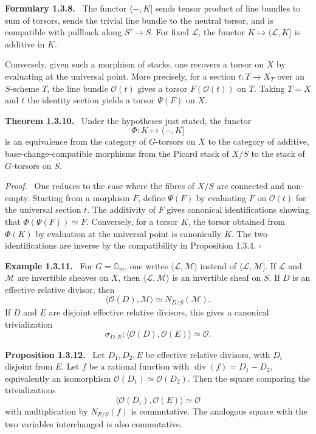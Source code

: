 \documentclass[12pt]{article}
\newcommand{\Ll}{\mathcal L}
\newcommand{\Mm}{\mathcal M}
\newcommand{\Ocal}{\mathcal O}
\newcommand{\qedtext}{\hfill\(\square\)}
\newenvironment{statement}[1]{\par\medskip\noindent\textbf{#1.}\ }{\par\medskip}
\newenvironment{remarktext}[1]{\par\medskip\noindent\textbf{#1.}\ }{\par\medskip}
\newenvironment{prooftext}[1][Proof]{\par\noindent\emph{#1.}\ }{\par\medskip}
\begin{document}
\begin{statement}{Formulary 1.3.8}
The functor \(\langle -,K]\) sends tensor product of line bundles to sum of torsors, sends the trivial line bundle to the neutral torsor, and is compatible with pullback along \(S'\to S\). For fixed \(\Ll\), the functor \(K\mapsto\langle\Ll,K]\) is additive in \(K\).
\end{statement}

Conversely, given such a morphism of stacks, one recovers a torsor on \(X\) by evaluating at the universal point. More precisely, for a section \(t:T\to X_T\) over an \(S\)-scheme \(T\), the line bundle \(\Ocal(t)\) gives a torsor \(F(\Ocal(t))\) on \(T\). Taking \(T=X\) and \(t\) the identity section yields a torsor \(\Psi(F)\) on \(X\).

\begin{statement}{Theorem 1.3.10}
Under the hypotheses just stated, the functor
\[
\Phi:K\longmapsto\langle -,K]
\]
is an equivalence from the category of \(G\)-torsors on \(X\) to the category of additive, base-change-compatible morphisms from the Picard stack of \(X/S\) to the stack of \(G\)-torsors on \(S\).
\end{statement}

\begin{prooftext}
One reduces to the case where the fibres of \(X/S\) are connected and non-empty. Starting from a morphism \(F\), define \(\Psi(F)\) by evaluating \(F\) on \(\Ocal(t)\) for the universal section \(t\). The additivity of \(F\) gives canonical identifications showing that \(\Phi(\Psi(F))\simeq F\). Conversely, for a torsor \(K\), the torsor obtained from \(\Phi(K)\) by evaluation at the universal point is canonically \(K\). The two identifications are inverse by the compatibility in Proposition 1.3.4. \qedtext
\end{prooftext}

\begin{remarktext}{Example 1.3.11}
For \(G=\mathbb G_m\), one writes \(\langle \Ll,\Mm\rangle\) instead of \(\langle\Ll,\Mm]\). If \(\Ll\) and \(\Mm\) are invertible sheaves on \(X\), then \(\langle\Ll,\Mm\rangle\) is an invertible sheaf on \(S\). If \(D\) is an effective relative divisor, then
\[
\langle \Ocal(D),\Mm\rangle\simeq N_{D/S}(\Mm).
\]
If \(D\) and \(E\) are disjoint effective relative divisors, this gives a canonical trivialization
\[
\sigma_{D,E}:\langle \Ocal(D),\Ocal(E)\rangle\simeq \Ocal.
\]
\end{remarktext}

\begin{statement}{Proposition 1.3.12}
Let \(D_1,D_2,E\) be effective relative divisors, with \(D_i\) disjoint from \(E\). Let \(f\) be a rational function with \(\operatorname{div}(f)=D_1-D_2\), equivalently an isomorphism \(\Ocal(D_1)\simeq\Ocal(D_2)\). Then the square comparing the trivializations
\[
\langle\Ocal(D_i),\Ocal(E)\rangle\simeq\Ocal
\]
with multiplication by \(N_{E/S}(f)\) is commutative. The analogous square with the two variables interchanged is also commutative.
\end{statement}
\end{document}
